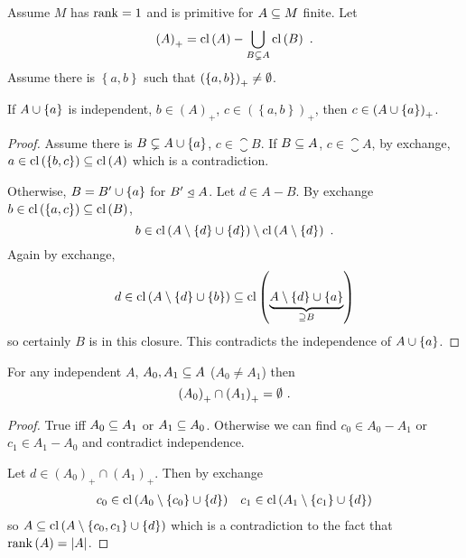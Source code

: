 \documentclass{amsart}
\begin{document}
\begin{Proof}
Assume $M$ has $\operatorname{rank} = 1$ and is primitive for $A\subseteq M$ finite. Let 
\begin{equation}
\left(A\right)_+ = 
\operatorname{cl}\left(A\right) - \bigcup_{B\subsetneq A} \operatorname{cl}\left(B\right) \ .
\end{equation}
Assume there is $\left\{a,b\right\}$ such that $\left(\left\{a,b\right\}\right)_+\neq
\emptyset$.
\begin{lem}
If $A\cup \left\{a\right\}$ is independent, $b\in \left(A\right)_+$, 
$c\in \left(\left\{a,b\right\}\right)_+$, then $c\in \left(A\cup\left\{a\right\}\right)_+$.
\end{lem}
\begin{proof}
Assume there is $B\subsetneq A\cup \left\{a\right\}$, $c\in \closure{B}$. 
If $B\subseteq A$, $c\in \closure{A}$, by exchange, $a\in \operatorname{cl}\left( \left\{b,c\right\}\right)\subseteq
\operatorname{cl}\left(A\right)$ which is a contradiction. 

Otherwise, $B = B'\cup\left\{a\right\}$ for $B'\ \underline{\triangleleft}\  A$. Let $d\in A\minus B$.
By exchange $b\in \operatorname{cl}\left( \left\{a,c\right\}\right)\subseteq \operatorname{cl}\left(B\right)$, 
\begin{equation}
b\in \operatorname{cl}\left(A\setminus \left\{d\right\}\cup \left\{d\right\}\right)\setminus \operatorname{cl}\left(A\setminus
\left\{d\right\}\right) \ .
\end{equation}
Again by exchange,
\begin{equation}
d\in \operatorname{cl}\left(A\setminus \left\{d\right\}\cup \left\{b\right\}\right)\subseteq 
\operatorname{cl}\left(\underbrace{A\setminus \left\{d\right\}\cup \left\{a\right\}}_{\supseteq B}\right)
\end{equation}
so certainly $B$ is in this closure.
This contradicts the independence of $A\cup \left\{a\right\}$.
\end{proof}
\begin{lem}
For any independent $A$, $A_0 , A_1\subseteq A$ ($A_0\neq A_1$) then
\begin{equation}
\left(A_0\right)_+ \cap \left(A_1\right)_+ = \emptyset \ .
\end{equation}
\end{lem}
\begin{proof}
True iff $A_0\subseteq A_1$ or $A_1 \subseteq A_0$. Otherwise we can find $c_0\in A_0\minus A_1$
or $c_1\in A_1 \minus A_0$ and contradict independence. 

Let $d\in \left(A_0\right)_+ \cap \left(A_1\right)_+$. Then by exchange
\begin{align}
c_0\in \operatorname{cl}\left(A_0\setminus\left\{c_0\right\}\cup \left\{d\right\}\right)&&
c_1\in \operatorname{cl}\left(A_1\setminus\left\{c_1\right\}\cup \left\{d\right\}\right)
\end{align}
so $A\subseteq \operatorname{cl}\left(A\setminus \left\{c_0 , c_1\right\}\cup\left\{d\right\}\right)$
which is a
contradiction to the fact that $\operatorname{rank}\left(A\right) = \left| A \right|$.
\end{proof}


\end{Proof}
\end{document}
